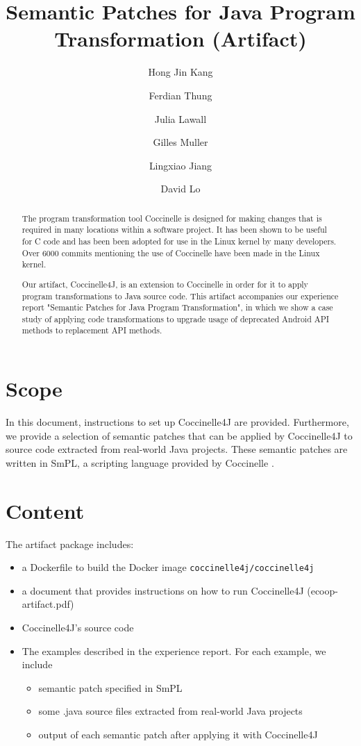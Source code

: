 \documentclass[a4paper,UKenglish]{darts-v2019}
\title{Semantic Patches for Java Program Transformation (Artifact)}
\author{Hong Jin Kang}{School of Information Systems, Singapore Management University, Singapore}{hjkang.2018@phdis.smu.edu.sg}{}{}
\author{Ferdian Thung}{School of Information Systems, Singapore Management University, Singapore}{ferdiant.2013@phdis.smu.edu.sg}{}{}
\author{Julia Lawall}{Sorbonne Université/Inria/LIP6, France}{Julia.Lawall@lip6.fr,}{}{}
\author{Gilles Muller}{Sorbonne Université/Inria/LIP6, France}{Gilles.Muller@lip6.fr}{}{}
\author{Lingxiao Jiang}{School of Information Systems, Singapore Management University, Singapore}{lxjiang@smu.edu.sg}{}{}
\author{David Lo}{School of Information Systems, Singapore Management University, Singapore}{davidlo@smu.edu.sg}{}{}
\newenvironment{scope}{\section{Scope}}{}
\newenvironment{content}{\section{Content}}{}
\begin{document}
\maketitle

\begin{abstract}
The program transformation tool Coccinelle is designed for making changes that is required in many locations within a software project.
It has been shown to be useful for C code and has been been adopted for use in the Linux kernel by many developers. 
Over 6000 commits mentioning the use of Coccinelle have been made in the Linux kernel. 

Our artifact, Coccinelle4J, is an extension to Coccinelle in order for it to apply program transformations to Java source code. 
This artifact accompanies our experience report "Semantic Patches for Java Program Transformation", in which we show a case study of applying code transformations to upgrade usage of deprecated Android API methods to  replacement API methods. 
 \end{abstract}


\begin{scope}


In this document, instructions to set up Coccinelle4J are provided. 
Furthermore, we provide a selection of semantic patches that can be applied by Coccinelle4J to source code extracted from real-world Java projects. 
These semantic patches are written in SmPL, a scripting language provided by Coccinelle \cite{padioleau2007smpl}. 

\end{scope}

\begin{content}
The artifact package includes:
\begin{itemize}
\item a Dockerfile to build the Docker image \texttt{coccinelle4j/coccinelle4j}
\item a document that provides instructions on how to run Coccinelle4J (ecoop-artifact.pdf)
\item Coccinelle4J's source code
\item The examples described in the experience report. For each example, we include
\begin{itemize} 
    \item semantic patch specified in SmPL
    \item some .java source files extracted from real-world Java projects
    \item output of each semantic patch after applying it with Coccinelle4J
\end{itemize} 

\end{itemize}
\end{content}
\end{document}
